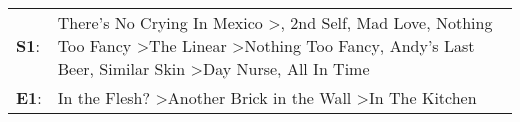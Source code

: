 \begin{supertabular}{p{0.03\textwidth}p{0.92\textwidth}}
 \textbf{S1}:  &  There's No Crying In Mexico\textsuperscript{} \textgreater {}\textsuperscript{}, \enspace 2nd Self\textsuperscript{}, \enspace Mad Love\textsuperscript{}, \enspace Nothing Too Fancy\textsuperscript{} \textgreater \enspace The Linear\textsuperscript{} \textgreater \enspace Nothing Too Fancy\textsuperscript{}, \enspace Andy's Last Beer\textsuperscript{}, \enspace Similar Skin\textsuperscript{} \textgreater \enspace Day Nurse\textsuperscript{}, \enspace All In Time\textsuperscript{}  \enspace  \\
 \textbf{E1}:  &                                                                                                                                                                                                                                                                                                                                                         In the Flesh?\textsuperscript{} \textgreater \enspace Another Brick in the Wall\textsuperscript{} \textgreater \enspace In The Kitchen\textsuperscript{}  \enspace  \\
\end{supertabular}
